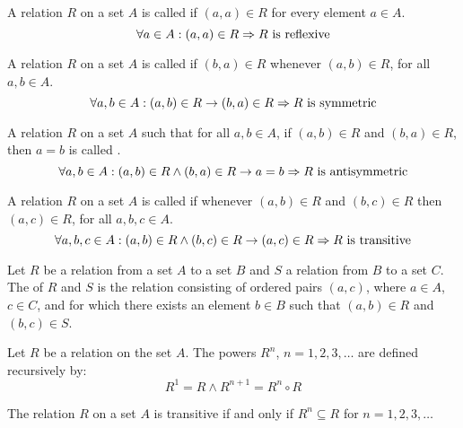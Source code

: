                 \par A relation $R$ on a set $A$ is called  if $(a, a) \in R$ for
                every element $a \in A$.
                \begin{equation}
                    \forall a \in A: (a, a) \in R \Rightarrow R \mbox{ is reflexive}
                \end{equation}
                \par A relation $R$ on a set $A$ is called  if $(b, a) \in R$
                whenever $(a, b) \in R$, for all $a, b \in A$.
                \begin{equation}
                    \forall a, b \in A: (a, b) \in R \rightarrow (b, a) \in R
                    \Rightarrow R \mbox{ is symmetric}
                \end{equation}
                \par A relation $R$ on a set $A$ such that for all $a, b \in A$, if $(a, b) \in R$
                and $(b, a) \in R$, then $a = b$ is called .
                \begin{equation}
                    \forall a, b \in A: (a, b) \in R \land (b, a) \in R \rightarrow a = b
                    \Rightarrow R \mbox{ is antisymmetric}
                \end{equation}
                \par A relation $R$ on a set $A$ is called  if whenever
                $(a, b) \in R$
                and $(b, c) \in R$ then $(a, c) \in R$, for all $a, b, c \in A$.
                \begin{equation}
                    \forall a, b, c \in A: (a, b) \in R \land (b, c) \in R \rightarrow (a, c) \in R
                    \Rightarrow R \mbox{ is transitive}
                \end{equation}
        \hiiEND

            \par Let $R$ be a relation from a set $A$ to a set $B$ and $S$ a relation from $B$ to
            a set $C$. The  of $R$ and $S$ is the relation consisting of ordered pairs
            $(a, c)$, where $a \in A$, $c \in C$, and for which there exists an element $b \in B$ such
            that $(a, b) \in R$ and $(b, c) \in S$.

                \par Let $R$ be a relation on the set $A$. The powers $R^{n}$, $n = 1, 2, 3, \ldots$
                are defined recursively by:
                \begin{equation}
                    R^{1} = R \land R^{n + 1} = R^{n} \circ R
                \end{equation}
                \par The relation $R$ on a set $A$ is transitive if and only if $R^{n} \subseteq R$
                for $n = 1, 2, 3, \ldots$
        \hiiEND

